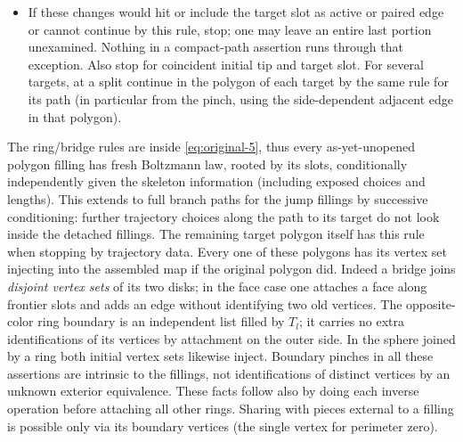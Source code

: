 \begin{itemize}
For \(k=1\), delete the edge and use the adjacent old slot on the chosen side as new active (\(-1\) on that side); the old endpoints coincide.
\item If these changes would hit or include the target slot as active or paired edge or cannot continue by this rule, stop; one may leave an entire last portion unexamined. Nothing in a compact-path assertion runs through that exception. Also stop for coincident initial tip and target slot. For several targets, at a split continue in the polygon of each target by the same rule for its path (in particular from the pinch, using the side-dependent adjacent edge in that polygon).
\end{itemize}


The ring/bridge rules are inside \eqref{eq:original-5}, thus every as-yet-unopened polygon filling has fresh Boltzmann law, rooted by its slots, conditionally independently given the skeleton information (including exposed choices and lengths).
This extends to full branch paths for the jump fillings by successive conditioning: further trajectory choices along the path to its target do not look inside the detached fillings.
The remaining target polygon itself has this rule when stopping by trajectory data.
Every one of these polygons has its vertex set injecting into the assembled map if the original polygon did.
Indeed a bridge joins \emph{disjoint vertex sets} of its two disks; in the face case one attaches a face along frontier slots and adds an edge without identifying two old vertices.
The opposite-color ring boundary is an independent list filled by \(T_l\); it carries no extra identifications of its vertices by attachment on the outer side.
In the sphere joined by a ring both initial vertex sets likewise inject.
Boundary pinches in all these assertions are intrinsic to the fillings, not identifications of distinct vertices by an unknown exterior equivalence.
These facts follow also by doing each inverse operation before attaching all other rings.
Sharing with pieces external to a filling is possible only via its boundary vertices (the single vertex for perimeter zero).

